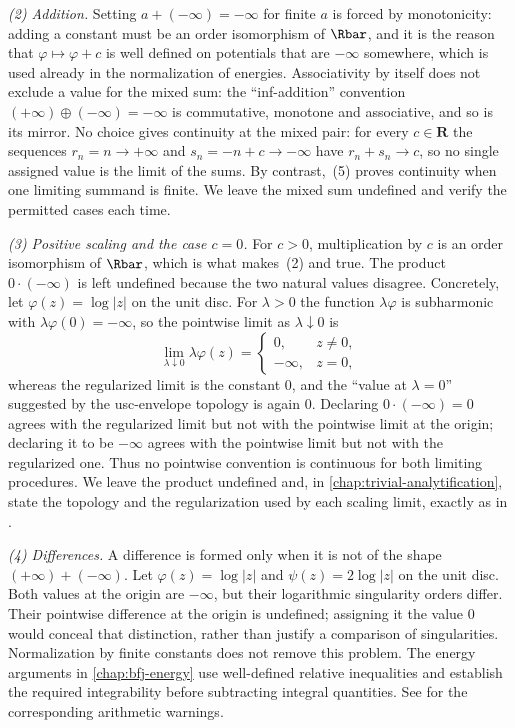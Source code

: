 \emph{(2) Addition.}  Setting $a+(-\infty)=-\infty$ for finite $a$ is forced
by monotonicity: adding a constant must be an order isomorphism of $\Rbar$,
and it is the reason that
$\varphi\mapsto\varphi+c$ is well defined on potentials that are $-\infty$
somewhere, which is used already in the normalization of energies.
Associativity by itself does not exclude a value for the mixed sum:
the ``inf-addition'' convention
$(+\infty)\oplus(-\infty)=-\infty$ is commutative, monotone and associative,
and so is its mirror.  No choice gives continuity at the mixed pair:
for every $c\in\mathbf R$ the sequences $r_n=n\to+\infty$ and
$s_n=-n+c\to-\infty$ have $r_n+s_n\to c$, so no single assigned value is the
limit of the sums.  By contrast, \,(5) proves
continuity when one limiting summand is finite.  We leave the mixed sum
undefined and verify the permitted cases each time.

\emph{(3) Positive scaling and the case $c=0$.}  For $c>0$, multiplication by
$c$ is an order isomorphism of $\Rbar$, which is what makes
\,(2) and
 true.  The product $0\cdot(-\infty)$ is left
undefined because the two natural values disagree.  Concretely, let
$\varphi(z)=\log|z|$ on the unit disc.  For $\lambda>0$ the function
$\lambda\varphi$ is subharmonic with $\lambda\varphi(0)=-\infty$, so the
pointwise limit as $\lambda\downarrow0$ is
\[
 \lim_{\lambda\downarrow0}\lambda\varphi(z)=
 \begin{cases}0,&z\neq0,\\ -\infty,&z=0,\end{cases}
\]
whereas the regularized limit is the constant $0$, and the ``value at
$\lambda=0$'' suggested by the usc-envelope topology is again $0$.
Declaring $0\cdot(-\infty)=0$ agrees with the regularized limit but not with
the pointwise limit at the origin; declaring it to be $-\infty$ agrees with
the pointwise limit but not with the regularized one.  Thus no pointwise
convention is continuous for both limiting procedures.  We leave the product
undefined and, in \cref{chap:trivial-analytification}, state the topology and
the regularization used by each scaling limit, exactly as in
.

\emph{(4) Differences.}  A difference is formed only when it is not of the
shape $(+\infty)+(-\infty)$.  Let $\varphi(z)=\log|z|$ and
$\psi(z)=2\log|z|$ on the unit disc.  Both values at the origin are
$-\infty$, but their logarithmic singularity orders differ.  Their
pointwise difference at the origin is undefined; assigning it the value
$0$ would conceal that distinction, rather than justify a comparison of
singularities.  Normalization by finite constants does not remove this
problem.  The energy arguments in \cref{chap:bfj-energy} use well-defined
relative inequalities and establish the required integrability before
subtracting integral quantities.  See 
for the corresponding arithmetic warnings.

